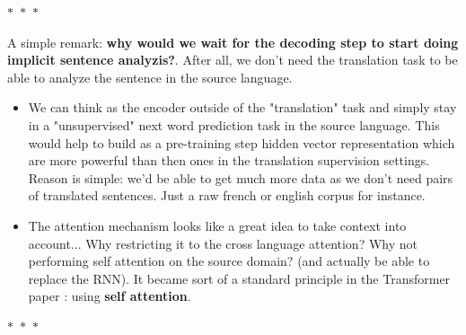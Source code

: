 \documentclass[a4paper]{article}
\begin{document}
\begin{center}
  $\ast$~$\ast$~$\ast$
\end{center}

A simple remark: \textbf{why would we wait for the decoding step to start doing implicit sentence analyzis?}. After all, we don't need the translation task to be able to analyze the sentence in the source language.
\begin{itemize}
    \item We can think as the encoder outside of the "translation" task and simply stay in a "unsupervised" next word prediction task in the source language. This would help to build as a pre-training step hidden vector representation which are more powerful than then ones in the translation supervision settings. Reason is simple: we'd be able to get much more data as we don't need pairs of translated sentences. Just a raw french or english corpus for instance.
    \item The attention mechanism looks like a great idea to take context into account... Why restricting it to the cross language attention? Why not performing self attention on the source domain? (and actually be able to replace the RNN). It became sort of a standard principle in the Transformer paper \cite{vaswani2017attention_transformer}: using \textbf{self attention}.
\end{itemize}

\begin{center}
  $\ast$~$\ast$~$\ast$
\end{center}





\end{document}
